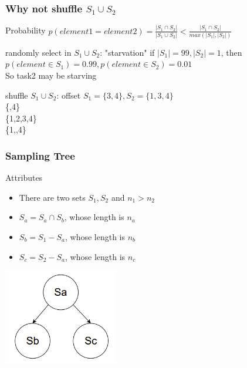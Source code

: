 \documentclass[notheorems, aspectratio=54]{beamer}
\begin{document}
\begin{frame}
    \frametitle{Why not shuffle $S_1 \cup S_2$}
    \begin{block} {Probability}
        $p(element1=element2) = \frac{|S_1\cap S_2|}{|S_1 \cup S_2|} < \frac{|S_1\cap S_2|}{max(|S_1|,|S_2|)}$
    \end{block}
    \begin{block} {randomly select in $S_1\cup S_2$: "starvation"}
        if $|S_1| = 99, |S_2| = 1$,
        then $p(element \in S_1) = 0.99, p(element \in S_2) = 0.01$ \\
        So task2 may be starving
    \end{block}
    \begin{block} {shuffle $S_1\cup S_2$: offset}
        $S_1 = \{3,4\}, S_2 = \{1,3,4\}$\\
        \{\space \space \space {},4\}\\
        \{1,2,3,4\} \\
        \{1,\space {},4\}\\
    \end{block}
\end{frame}

\begin{frame}
    \frametitle{Sampling Tree}
    \begin{block} {Attributes}
        \begin{itemize}
            \item There are two sets $S_1, S_2$ and $n_1 > n_2$
            \item $S_a = S_a\cap S_b$, whose length is $n_a$
            \item $S_b = S_1- S_a$, whose length is $n_b$
            \item $S_c = S_2- S_a$, whose length is $n_c$
        \end{itemize}
    \end{block}
    \centering
    \includegraphics[width=5cm]{global_img_dir/SamplingTree1.png}
\end{frame}
\end{document}
